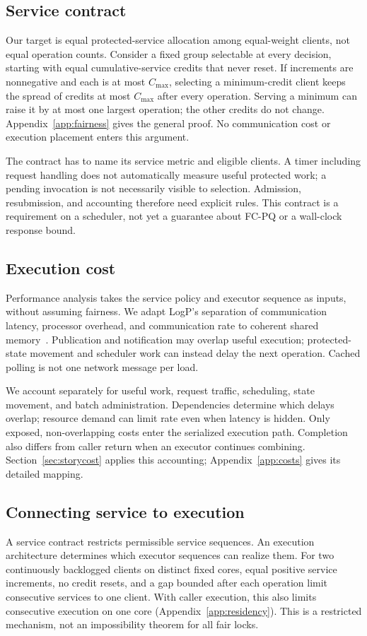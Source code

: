 \documentclass[10pt,twocolumn]{article}
\begin{document}
\subsection{Service contract}
\label{sec:storyfairness}
Our target is equal protected-service allocation among equal-weight clients,
not equal operation counts. Consider a fixed group selectable at every
decision, starting with equal cumulative-service credits that never reset.
If increments are nonnegative and each is at most $C_{\max}$, selecting a
minimum-credit client keeps the spread of credits at most $C_{\max}$ after
every operation. Serving a minimum can raise it by at most one largest
operation; the other credits do not change. Appendix~\ref{app:fairness}
gives the general proof. No communication cost or execution placement enters
this argument.

The contract has to name its service metric and eligible clients. A timer
including request handling does not automatically measure useful protected
work; a pending invocation is not necessarily visible to selection. Admission,
resubmission, and accounting therefore need explicit rules. This contract is
a requirement on a scheduler, not yet a guarantee about FC-PQ or a wall-clock
response bound.

\subsection{Execution cost}
Performance analysis takes the service policy and executor sequence as inputs,
without assuming fairness. We adapt LogP's separation of communication
latency, processor overhead, and communication rate to coherent shared
memory~\cite{logp,coherence}. Publication and notification may overlap useful
execution; protected-state movement and scheduler work can instead delay the
next operation. Cached polling is not one network message per load.

We account separately for useful work, request traffic, scheduling, state
movement, and batch administration. Dependencies determine which delays
overlap; resource demand can limit rate even when latency is hidden. Only
exposed, non-overlapping costs enter the serialized execution path. Completion
also differs from caller return when an executor continues combining.
Section~\ref{sec:storycost} applies this accounting; Appendix~\ref{app:costs}
gives its detailed mapping.

\subsection{Connecting service to execution}
A service contract restricts permissible service sequences. An execution
architecture determines which executor sequences can realize them. For two
continuously backlogged clients on distinct fixed cores, equal positive
service increments, no credit resets, and a gap bounded after each operation
limit consecutive services to one client. With caller execution, this also
limits consecutive execution on one core (Appendix~\ref{app:residency}).
This is a restricted mechanism, not an impossibility theorem for all fair locks.
\end{document}
